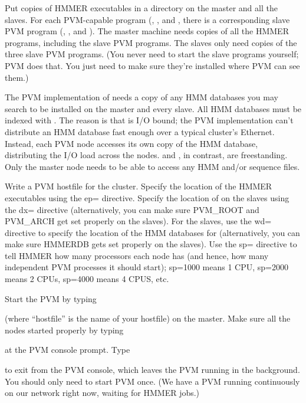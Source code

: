 Put copies of HMMER executables in a directory on the master and all
the slaves. For each PVM-capable program (,
, and , there is a corresponding slave
PVM program (, , and
). The master machine needs copies of all the HMMER
programs, including the slave PVM programs.  The slaves only need
copies of the three slave PVM programs. (You never need to start the
slave programs yourself; PVM does that. You just need to make sure
they're installed where PVM can see them.)

The PVM implementation of  needs a copy of any HMM
databases you may search to be installed on the master and every
slave. All HMM databases must be indexed with . The
reason is that  is I/O bound; the PVM implementation
can't distribute an HMM database fast enough over a typical cluster's
Ethernet. Instead, each PVM node accesses its own copy of the HMM
database, distributing the I/O load across the nodes.
 and , in contrast, are
freestanding. Only the master node needs to be able to access any HMM
and/or sequence files.

Write a PVM hostfile for the cluster. Specify the location of the
HMMER executables using the ep= directive. Specify the location of
 on the slaves using the dx= directive (alternatively, you
can make sure PVM\_ROOT and PVM\_ARCH get set properly on the
slaves). For the slaves, use the wd= directive to specify the location
of the HMM databases for  (alternatively, you can make
sure HMMERDB gets set properly on the slaves). Use the sp= directive
to tell HMMER how many processors each node has (and hence, how many
independent PVM processes it should start); sp=1000 means 1 CPU,
sp=2000 means 2 CPUs, sp=4000 means 4 CPUS, etc.

Start the PVM by typing\\ 


(where ``hostfile'' is the name of your hostfile) on the master. Make
sure all the nodes started properly by typing 


at the PVM
console prompt.  Type 


to exit from the PVM console, which leaves the PVM running in the
background.  You should only need to start PVM once. (We have a PVM
running continuously on our network right now, waiting for HMMER
jobs.)

